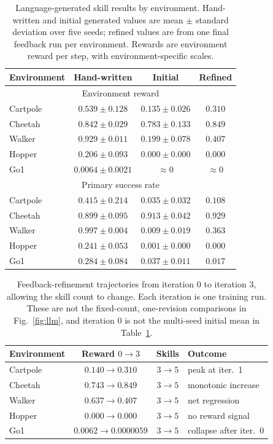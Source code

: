 \documentclass[conference,letterpaper,10pt]{IEEEtran}
\begin{document}
\begin{table}[!t]
\caption{Language-generated skill results by environment. Hand-written and initial generated values are mean $\pm$ standard deviation over five seeds; refined values are from one final feedback run per environment. Rewards are environment reward per step, with environment-specific scales.}
\label{tab:llmmain}
\centering
\footnotesize
\setlength{\tabcolsep}{3pt}
\begin{tabular}{@{}lccc@{}}
\toprule
Environment & Hand-written & Initial & Refined\\
\midrule
\multicolumn{4}{c}{Environment reward}\\
\midrule
Cartpole & $0.539\pm0.128$ & $0.135\pm0.026$ & $0.310$\\
Cheetah & $0.842\pm0.029$ & $0.783\pm0.133$ & $0.849$\\
Walker & $0.929\pm0.011$ & $0.199\pm0.078$ & $0.407$\\
Hopper & $0.206\pm0.093$ & $0.000\pm0.000$ & $0.000$\\
Go1 & $0.0064\pm0.0021$ & $\approx0$ & $\approx0$\\
\midrule
\multicolumn{4}{c}{Primary success rate}\\
\midrule
Cartpole & $0.415\pm0.214$ & $0.035\pm0.032$ & $0.108$\\
Cheetah & $0.899\pm0.095$ & $0.913\pm0.042$ & $0.929$\\
Walker & $0.997\pm0.004$ & $0.009\pm0.019$ & $0.363$\\
Hopper & $0.241\pm0.053$ & $0.001\pm0.000$ & $0.000$\\
Go1 & $0.284\pm0.084$ & $0.037\pm0.011$ & $0.017$\\
\bottomrule
\end{tabular}
\end{table}


\begin{table}[!t]
\caption{Feedback-refinement trajectories from iteration 0 to iteration 3, allowing the skill count to change. Each iteration is one training run. These are not the fixed-count, one-revision comparisons in Fig.~\ref{fig:llm}, and iteration 0 is not the multi-seed initial mean in Table~\ref{tab:llmmain}.}
\label{tab:refineoutcome}
\centering
\footnotesize
\setlength{\tabcolsep}{4pt}
\begin{tabular}{@{}lccl@{}}
\toprule
Environment & Reward $0\rightarrow3$ & Skills & Outcome\\
\midrule
Cartpole & $0.140\rightarrow0.310$ & $3\rightarrow5$ & peak at iter.~1\\
Cheetah & $0.743\rightarrow0.849$ & $3\rightarrow5$ & monotonic increase\\
Walker & $0.637\rightarrow0.407$ & $3\rightarrow5$ & net regression\\
Hopper & $0.000\rightarrow0.000$ & $3\rightarrow5$ & no reward signal\\
Go1 & $0.0062\rightarrow0.0000059$ & $3\rightarrow5$ & collapse after iter.~0\\
\bottomrule
\end{tabular}
\end{table}
\end{document}

